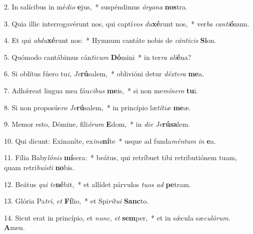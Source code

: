 2. In salícibus in mé\textit{di}\textit{o} \textbf{e}jus,~*  suspéndimus \textit{ór}\textit{ga}\textit{na} \textbf{nos}tra.\

3. Quia illic interrogavérunt nos, qui captí\textit{vos} \textit{du}\textbf{xé}runt nos,~*  ver\textit{ba} \textit{can}\textit{ti}\textbf{ó}num.\

4. Et qui \textit{ab}\textit{du}\textbf{xé}runt nos:~*  Hymnum cantáte nobis de \textit{cán}\textit{ti}\textit{cis} \textbf{Si}on.\

5. Quómodo cantábimus cán\textit{ti}\textit{cum} \textbf{Dó}mini~*  in ter\textit{ra} \textit{a}\textit{li}\textbf{é}na?\

6. Si oblítus fúero tu\textit{i}, \textit{Je}\textbf{rú}salem,~*  oblivióni detur \textit{déx}\textit{te}\textit{ra} \textbf{me}a.\

7. Adhǽreat lingua mea fáu\textit{ci}\textit{bus} \textbf{me}is,~*  si non me\textit{mí}\textit{ne}\textit{ro} \textbf{tu}i.\

8. Si non proposúe\textit{ro} \textit{Je}\textbf{rú}salem,~*  in princípio læ\textit{tí}\textit{ti}\textit{æ} \textbf{me}æ.\

9. Memor esto, Dómine, fili\textit{ó}\textit{rum} \textbf{E}dom,~*  in \textit{di}\textit{e} \textit{Je}\textbf{rú}\textbf{sa}lem.\

10. Qui dicunt: Exinaníte, ex\textit{i}\textit{na}\textbf{ní}te~*  usque ad funda\textit{mén}\textit{tum} \textit{in} \textbf{e}a.\

11. Fília Baby\textit{ló}\textit{nis} \textbf{mí}sera:~*  beátus, qui retríbuet tibi retributiónem tuam, quam retri\textit{bu}\textit{ís}\textit{ti} \textbf{no}bis.\

12. Beátus \textit{qui} \textit{te}\textbf{né}bit,~*  et allídet párvulos \textit{tu}\textit{os} \textit{ad} \textbf{pe}tram.\

13. Glória Pa\textit{tri}, \textit{et} \textbf{Fí}lio,~*  et Spi\textit{rí}\textit{tu}\textit{i} \textbf{Sanc}to.\

14. Sicut erat in princípio, et \textit{nunc}, \textit{et} \textbf{sem}per,~*  et in sǽcula sæ\textit{cu}\textit{ló}\textit{rum}. \textbf{A}men.\

